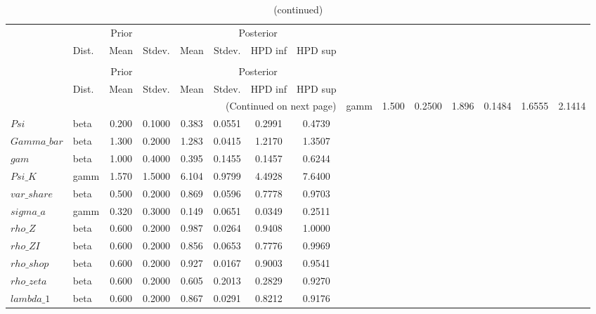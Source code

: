  
\begin{center}
\begin{longtable}{llcccccc} 
\caption{Results from Metropolis-Hastings (parameters)}
 \label{Table:MHPosterior:1}\\
\toprule 
  & \multicolumn{3}{c}{Prior}  &  \multicolumn{4}{c}{Posterior} \\
  \cmidrule(r{.75em}){2-4} \cmidrule(r{.75em}){5-8}
  & Dist. & Mean  & Stdev. & Mean & Stdev. & HPD inf & HPD sup\\
\midrule \endfirsthead 
\caption{(continued)}\\\toprule 
  & \multicolumn{3}{c}{Prior}  &  \multicolumn{4}{c}{Posterior} \\
  \cmidrule(r{.75em}){2-4} \cmidrule(r{.75em}){5-8}
  & Dist. & Mean  & Stdev. & Mean & Stdev. & HPD inf & HPD sup\\
\midrule \endhead 
\bottomrule \multicolumn{8}{r}{(Continued on next page)} \endfoot 
\bottomrule \endlastfoot 
$sigma$ & gamm &   1.500 & 0.2500 &   1.896& 0.1484 &  1.6555 &  2.1414 \\ 
$Psi$ & beta &   0.200 & 0.1000 &   0.383& 0.0551 &  0.2991 &  0.4739 \\ 
$Gamma\_bar$ & beta &   1.300 & 0.2000 &   1.283& 0.0415 &  1.2170 &  1.3507 \\ 
$gam$ & beta &   1.000 & 0.4000 &   0.395& 0.1455 &  0.1457 &  0.6244 \\ 
$Psi\_K$ & gamm &   1.570 & 1.5000 &   6.104& 0.9799 &  4.4928 &  7.6400 \\ 
$var\_share$ & beta &   0.500 & 0.2000 &   0.869& 0.0596 &  0.7778 &  0.9703 \\ 
$sigma\_a$ & gamm &   0.320 & 0.3000 &   0.149& 0.0651 &  0.0349 &  0.2511 \\ 
$rho\_Z$ & beta &   0.600 & 0.2000 &   0.987& 0.0264 &  0.9408 &  1.0000 \\ 
$rho\_ZI$ & beta &   0.600 & 0.2000 &   0.856& 0.0653 &  0.7776 &  0.9969 \\ 
$rho\_shop$ & beta &   0.600 & 0.2000 &   0.927& 0.0167 &  0.9003 &  0.9541 \\ 
$rho\_zeta$ & beta &   0.600 & 0.2000 &   0.605& 0.2013 &  0.2829 &  0.9270 \\ 
$lambda\_1$ & beta &   0.600 & 0.2000 &   0.867& 0.0291 &  0.8212 &  0.9176 \\ 
\end{longtable}
 \end{center}
